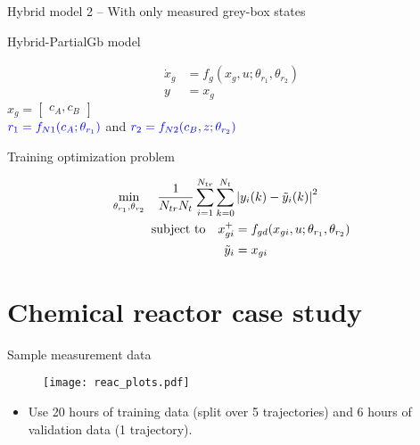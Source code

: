 \documentclass[xcolor=dvipsnames, 8pt]{beamer} %
\begin{document}
\begin{frame}{Hybrid model 2 -- With only measured grey-box states}


\begin{block}{Hybrid-PartialGb model}
	
	\begin{align*}
		\dot{x}_{g} &= f_g(x_g, u;\theta_{r_1}, \theta_{r_2}) \\ 
		y &= x_g
	\end{align*}
	$x_g = \begin{bmatrix} c_A, c_B\end{bmatrix}$ \\
	$\textcolor{blue}{r_1 = f_{N1}(c_A;\theta_{r_1})}$ and 
	$\textcolor{blue}{r_2 = f_{N2}(c_B, z;\theta_{r_2})}$
\end{block}

\pause
\begin{block}{Training optimization problem}
	
	\begin{align*}
		\underset{\theta_{r_1}, 
			\theta_{r_2}}{\textnormal{min}} \quad 
		\dfrac{1}{N_{tr} 
			N_t} \sum_{i=1}^{N_{tr}}
		\sum_{k=0}^{N_t} & \left| y_i(k) - \tilde{y}_i(k) \right|^2 \\ 
		\textnormal{subject to} \quad x_{gi}^+ & = f_{gd}(x_{gi}, 
		u;\theta_{r_1}, 
		\theta_{r_2}) \\
		\tilde{y}_i &= x_{gi} \\ 
	\end{align*}
\end{block}

\end{frame}

\section{Chemical reactor case study}
\begin{frame}{Sample measurement data}

	\begin{figure}
		\centering
		\texttt{[image: reac\_plots.pdf]}
	\end{figure}

\begin{itemize}
\item Use 20 hours of training data (split over 5 trajectories) and 6 hours of 
validation data (1 trajectory). 
\end{itemize}
\end{frame}
\end{document}
